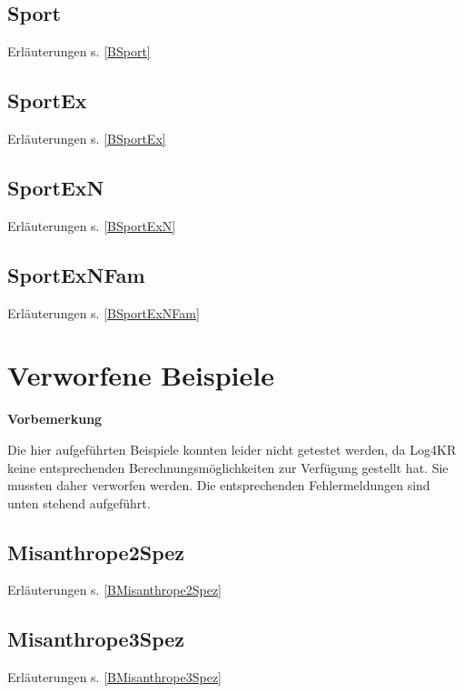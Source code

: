 \documentclass[draft]{scrreprt}
\begin{document}
{\newpage

\section{Sport} Erläuterungen s. \ref{BSport}
\label{Sport}

\newpage

\section{SportEx} Erläuterungen s. \ref{BSportEx}
\label{SportEx}

\newpage


\section{SportExN} Erläuterungen s. \ref{BSportExN}
\label{SportExN}



\newpage

\section{SportExNFam} Erläuterungen s. \ref{BSportExNFam}
\label{SportExNFam}



\newpage



\chapter{Verworfene Beispiele}
\label{examplesdep}
\textbf{Vorbemerkung}


\noindent
Die hier aufgeführten Beispiele konnten leider nicht getestet werden, da Log4KR keine entsprechenden Berechnungsmöglichkeiten zur Verfügung gestellt hat. Sie mussten daher verworfen werden. Die entsprechenden Fehlermeldungen sind unten stehend aufgeführt.

\section{Misanthrope2Spez} Erläuterungen s. \ref{BMisanthrope2Spez}
\label{Misanthrope2Spez}


\newpage


\section{Misanthrope3Spez} Erläuterungen s. \ref{BMisanthrope3Spez}
\label{Misanthrope3Spez}



}
\end{document}

